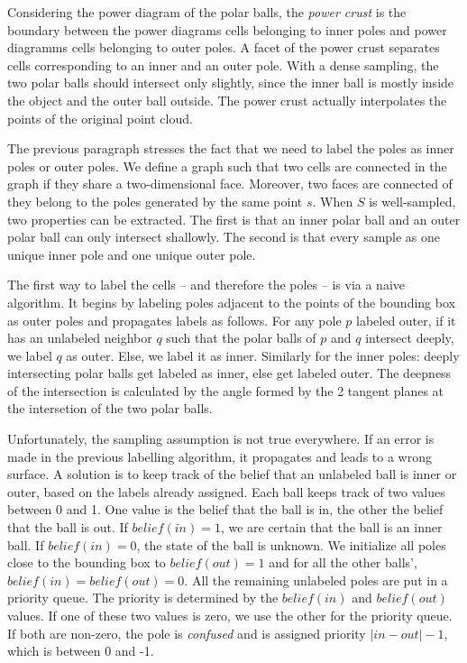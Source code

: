 \documentclass[a4paper]{article}
\begin{document}
Considering the power diagram of the polar balls, the \textit{power crust} is the boundary between the power diagrams cells belonging to inner poles and power diagramms cells belonging to outer poles. A facet of the power crust separates cells corresponding to an inner and an outer pole. With a dense sampling, the two polar balls should intersect only slightly, since the inner ball is mostly inside the object and the outer ball outside. The power crust actually interpolates the points of the original point cloud.

The previous paragraph stresses the fact that we need to label the poles as inner poles or outer poles. We define a graph such that two cells are connected in the graph if they share a two-dimensional face. Moreover, two faces are connected of they belong to the poles generated by the same point $s$. When $S$ is well-sampled, two properties can be extracted. The first is that an inner polar ball and an outer polar ball can only intersect shallowly. The second is that every sample as one unique inner pole and one unique outer pole. 

The first way to label the cells -- and therefore the poles -- is via a naive algorithm. It begins by labeling poles adjacent to the points of the bounding box as outer poles and propagates labels as follows. For any pole $p$ labeled outer, if it has an unlabeled neighbor $q$ such that the polar balls of $p$ and $q$ intersect deeply, we label $q$ as outer. Else, we label it as inner. Similarly for the inner poles: deeply intersecting polar balls get labeled as inner, else get labeled outer. The deepness of the intersection is calculated by the angle formed by the 2 tangent planes at the intersetion of the two polar balls.

Unfortunately, the sampling assumption is not true everywhere. If an error is made in the previous labelling algorithm, it propagates and leads to a wrong surface. A solution is to keep track of the belief that an unlabeled ball is inner or outer, based on the labels already assigned. Each ball keeps track of two values between 0 and 1. One value is the belief that the ball is in, the other the belief that the ball is out. If $belief(in) = 1$, we are certain that the ball is an inner ball. If $belief(in) = 0$, the state of the ball is unknown. We initialize all poles close to the bounding box to $belief(out) = 1$ and for all the other balls', $belief(in) = belief(out) = 0$.
All the remaining unlabeled poles are put in a priority queue. The priority is determined by the $belief(in)$ and $belief(out)$ values. If one of these two values is zero, we use the other for the priority queue. If both are non-zero, the pole is \textit{confused} and is assigned priority $|in - out| - 1$, which is between 0 and -1.
\end{document}
